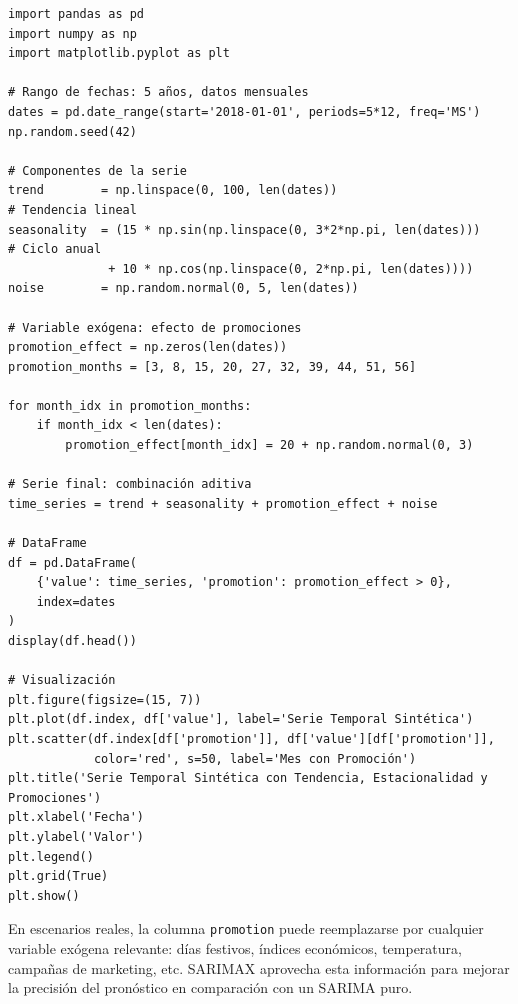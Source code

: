 \documentclass[12pt, a4paper]{article}
\begin{document}
\begin{lstlisting}[caption={Construcción del dataset sintético con tendencia, estacionalidad y variables exógenas}]
import pandas as pd
import numpy as np
import matplotlib.pyplot as plt

# Rango de fechas: 5 años, datos mensuales
dates = pd.date_range(start='2018-01-01', periods=5*12, freq='MS')
np.random.seed(42)

# Componentes de la serie
trend        = np.linspace(0, 100, len(dates))                              # Tendencia lineal
seasonality  = (15 * np.sin(np.linspace(0, 3*2*np.pi, len(dates)))          # Ciclo anual
              + 10 * np.cos(np.linspace(0, 2*np.pi, len(dates))))
noise        = np.random.normal(0, 5, len(dates))

# Variable exógena: efecto de promociones
promotion_effect = np.zeros(len(dates))
promotion_months = [3, 8, 15, 20, 27, 32, 39, 44, 51, 56]

for month_idx in promotion_months:
    if month_idx < len(dates):
        promotion_effect[month_idx] = 20 + np.random.normal(0, 3)

# Serie final: combinación aditiva
time_series = trend + seasonality + promotion_effect + noise

# DataFrame
df = pd.DataFrame(
    {'value': time_series, 'promotion': promotion_effect > 0},
    index=dates
)
display(df.head())

# Visualización
plt.figure(figsize=(15, 7))
plt.plot(df.index, df['value'], label='Serie Temporal Sintética')
plt.scatter(df.index[df['promotion']], df['value'][df['promotion']],
            color='red', s=50, label='Mes con Promoción')
plt.title('Serie Temporal Sintética con Tendencia, Estacionalidad y Promociones')
plt.xlabel('Fecha')
plt.ylabel('Valor')
plt.legend()
plt.grid(True)
plt.show()
\end{lstlisting}

\begin{nota}
  En escenarios reales, la columna \texttt{promotion} puede reemplazarse por
  cualquier variable exógena relevante: días festivos, índices económicos,
  temperatura, campañas de marketing, etc. SARIMAX aprovecha esta información
  para mejorar la precisión del pronóstico en comparación con un SARIMA puro.
\end{nota}

\newpage

\end{document}
